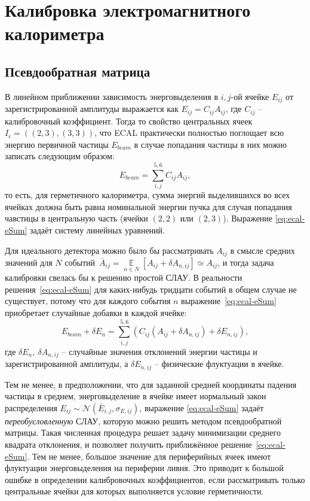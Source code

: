 \section{Калибровка электромагнитного калориметра}

\subsection{Псевдообратная матрица}

В линейном приближении зависимость энерговыделения в $i,j$-ой ячейке $E_{ij}$
от зарегистрированной амплитуды выражается как $E_{ij} = C_{ij} A_{ij}$, где
$C_{ij}$ -- калибровочный коэффициент. Тогда то свойство центральных
ячеек $I_c = ((2,3), (3,3))$, что ECAL практически полностью поглощает
всю энергию первичной частицы $E_{beam}$ в случае попадания частицы в них
можно записать следующим образом:
\begin{equation}
    E_{beam} = \sum\limits_{i,j}^{5,6} C_{ij} A_{ij},
    \label{eq:ecal-eSum}
\end{equation}
то есть, для герметичного калориметра, сумма энергий выделившихся во всех
ячейках должна быть равна номинальной энергии пучка для случая попадания
чавстицы в центральную часть (ячейки $(2,2)$ или $(2,3)$). Выражение
\eqref{eq:ecal-eSum} задаёт систему линейных уравнений.

Для идеального детектора можно было бы рассматривать $A_{ij}$ в смысле
средних значений для $N$ событий~$\bar{A}_{ij}=\mathop{\mathbb{E}}\limits_{n \in N}[A_{ij} + \delta A_{n,ij}] \simeq A_{ij}$, и тогда задача калибровки свелась
бы к решению простой СЛАУ. В реальности решения~\eqref{eq:ecal-eSum} для
каких-нибудь тридцати событий в общем
случае не существует, потому что для каждого события $n$
выражение~\eqref{eq:ecal-eSum} приобретает случайные добавки в каждой ячейке:
\begin{equation}
    E_{beam} + \delta E_n = \sum\limits_{i,j}^{5,6} \left( C_{ij} (A_{ij} + \delta A_{n,ij}) + \delta E_{n,ij} \right),
    \label{eq:ecal-eSum-deviating}
\end{equation}
где $\delta E_n,~\delta A_{n,ij}$ -- случайные значения отклонений энергии
частицы и зарегистрированной амплитуды, а $\delta E_{n,ij}$ -- физические флуктуации
в ячейке.

Тем не менее, в предположении, что для заданной средней координаты
падения частицы в среднем, энерговыделение в ячейке имеет нормальный
закон распределения $E_{ij} \sim \mathcal{N}(\bar{E}_{i,j},\sigma_{E,ij})$,
выражение \eqref{eq:ecal-eSum} задаёт \emph{переобусловленную} СЛАУ,
которую можно решить методом псевдообратной матрицы. Такая численная процедура
решает задачу минимизации среднего квадрата отклонения, и позволяет получить
приближённое решение~\eqref{eq:ecal-eSum}. Тем не менее, большое значение
для периферийных ячеек имеют флуктуации энерговыделения на
периферии ливня. Это приводит к большой ошибке в определении калибровочных
коэффициентов, если рассматривать только центральные ячейки для которых
выполняется условие герметичности.

